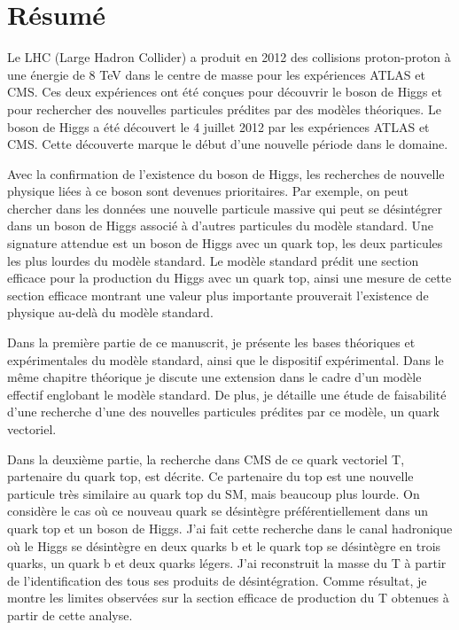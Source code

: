 \begin{otherlanguage}{francais}
\chapter*{R\'{e}sum\'{e}}

Le LHC (Large Hadron Collider) a produit en 2012 des collisions proton-proton à une énergie de 8 TeV  dans le centre de masse pour les expériences ATLAS et CMS. Ces deux expériences ont été conçues pour découvrir le boson de Higgs et pour rechercher des nouvelles particules prédites par des modèles théoriques. Le boson de Higgs a été découvert le 4 juillet 2012 par les expériences ATLAS et CMS. Cette découverte marque le début  d'une nouvelle période dans le domaine. 

Avec la confirmation de l'existence du boson de Higgs, les recherches de nouvelle physique liées à ce boson sont devenues prioritaires. Par exemple, on peut chercher dans les données une nouvelle particule massive qui peut se désintégrer dans un boson de Higgs associé à d'autres particules du modèle standard. Une signature attendue est un boson de Higgs avec un quark top, les deux particules les plus lourdes du modèle standard. Le modèle standard prédit une section efficace pour la production du Higgs avec un quark top, ainsi une mesure de cette section efficace montrant une valeur plus importante prouverait l'existence de physique au-delà du modèle standard.

Dans la première partie de ce manuscrit, je présente les bases théoriques et expérimentales du modèle standard, ainsi que le dispositif expérimental. Dans le même chapitre théorique je discute une extension dans le cadre d'un modèle effectif englobant le modèle standard. De plus, je détaille une étude de faisabilité d'une recherche d'une des nouvelles particules prédites par ce modèle, un quark vectoriel.

Dans la deuxième partie, la recherche dans CMS de ce quark vectoriel T,  partenaire du quark top, est décrite. Ce partenaire du top est une nouvelle particule très similaire au quark top du SM, mais beaucoup plus lourde. On considère le cas où ce nouveau quark se désintègre préférentiellement dans un quark top et un boson de Higgs. J'ai fait cette recherche dans le canal hadronique où le Higgs se désintègre en deux quarks b et le quark top se désintègre en trois quarks, un quark b et deux quarks légers. J'ai reconstruit la masse du T à partir de l'identification des tous ses produits de désintégration. Comme résultat, je montre les limites observées sur la section efficace de production du T obtenues à partir de cette analyse.
\end{otherlanguage}  

\endgroup